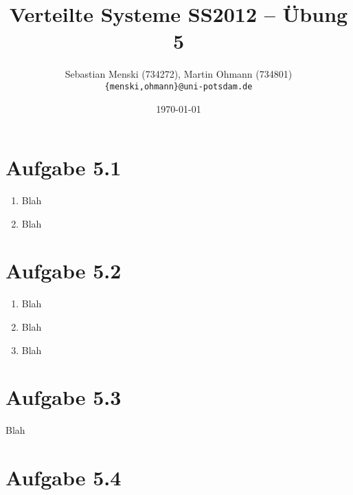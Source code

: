 \documentclass[german,12pt,a4paper]{article}
\begin{document}
\title{\textbf{Verteilte Systeme SS2012 -- Übung 5}}
\author{Sebastian Menski (734272), Martin Ohmann (734801) \\ \texttt{\{menski,ohmann\}@uni-potsdam.de}}
\date{\today}

\maketitle

\section*{Aufgabe 5.1}

\begin{enumerate}

	\item Blah

	\item Blah

\end{enumerate}

\section*{Aufgabe 5.2}

\begin{enumerate}

	\item Blah
	
	\item Blah
	
	\item Blah

\end{enumerate}

\section*{Aufgabe 5.3}

Blah

\section*{Aufgabe 5.4}
\end{document}
